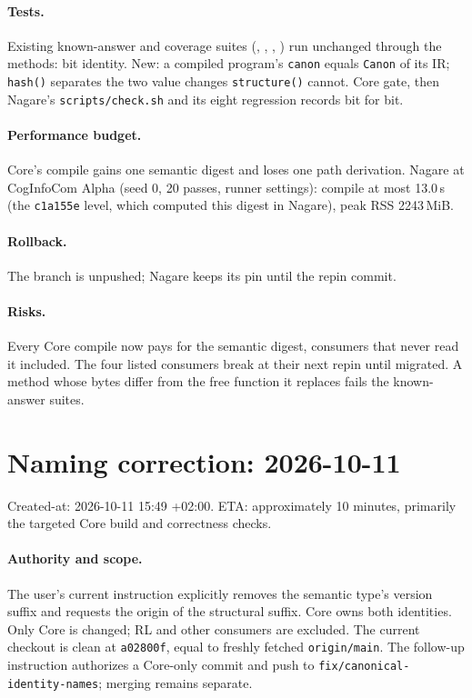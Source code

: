 \documentclass[11pt,a4paper]{article}
\begin{document}
\paragraph{Tests.} Existing known-answer and coverage suites (,
, , ) run unchanged through the
methods: bit identity. New: a compiled program's \texttt{canon} equals \texttt{Canon} of its IR;
\texttt{hash()} separates the two value changes \texttt{structure()} cannot. Core gate, then Nagare's
\texttt{scripts/check.sh} and its eight regression records bit for bit.

\paragraph{Performance budget.} Core's compile gains one semantic digest and loses one path
derivation. Nagare at CogInfoCom Alpha (seed 0, 20 passes, runner settings): compile at most
13.0\,s (the \texttt{c1a155e} level, which computed this digest in Nagare), peak RSS 2243\,MiB.

\paragraph{Rollback.} The branch is unpushed; Nagare keeps its pin until the repin commit.

\paragraph{Risks.} Every Core compile now pays for the semantic digest, consumers that never read
it included. The four listed consumers break at their next repin until migrated. A method whose
bytes differ from the free function it replaces fails the known-answer suites.

\section*{Naming correction: 2026-10-11}
Created-at: 2026-10-11 15:49 +02:00. ETA: approximately 10 minutes,
primarily the targeted Core build and correctness checks.

\paragraph{Authority and scope.} The user's current instruction explicitly removes
the semantic type's version suffix and requests the origin of the structural suffix.
Core owns both identities. Only Core is changed; RL and other consumers are excluded.
The current checkout is clean at \texttt{a02800f}, equal to freshly fetched
\texttt{origin/main}. The follow-up instruction authorizes a Core-only commit and
push to \texttt{fix/canonical-identity-names}; merging remains separate.
\end{document}

